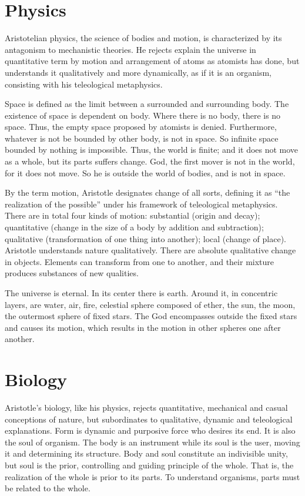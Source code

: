 \documentclass[11pt]{article}
\begin{document}
\section{Physics}
Aristotelian physics, the science of bodies and motion, is characterized by its antagonism to mechanistic theories. 
He rejects explain the universe in quantitative term by motion and arrangement of atoms as atomists has done, but understands it qualitatively and more dynamically, as if it is an organism, consisting with his teleological metaphysics.

\newline

Space is defined as the limit between a surrounded and surrounding body. 
The existence of space is dependent on body. 
Where there is no body, there is no space. 
Thus, the empty space proposed by atomists is denied. 
Furthermore, whatever is not be bounded by other body, is not in space. 
So infinite space bounded by nothing is impossible. 
Thus, the world is finite; 
and it does not move as a whole, but its parts suffers change. 
God, the first mover is not in the world, for it does not move. 
So he is outside the world of bodies, and is not in space.

\newline

By the term motion, Aristotle designates change of all sorts, defining it as “the realization of the possible” under his framework of teleological metaphysics. 
There are in total four kinds of motion: 
substantial (origin and decay); 
quantitative (change in the size of a body by addition and subtraction); 
qualitative (transformation of one thing into another); 
local (change of place). 
Aristotle understands nature qualitatively. 
There are absolute qualitative change in objects. 
Elements can transform from one to another, and their mixture produces substances of new qualities.

\newline

The universe is eternal. 
In its center there is earth. 
Around it, in concentric layers, are water, air, fire, celestial sphere composed of ether, the sun, the moon, the outermost sphere of fixed stars. 
The God encompasses outside the fixed stars and causes its motion, which results in the motion in other spheres one after another.

\section{Biology}
Aristotle’s biology, like his physics, rejects quantitative, mechanical and casual conceptions of nature, but subordinates to qualitative, dynamic and teleological explanations. 
Form is dynamic and purposive force who desires its end. 
It is also the soul of organism. 
The body is an instrument while its soul is the user, moving it and determining its structure. 
Body and soul constitute an indivisible unity, but soul is the prior, controlling and guiding principle of the whole. 
That is, the realization of the whole is prior to its parts. 
To understand organisms, parts must be related to the whole.
\end{document}
